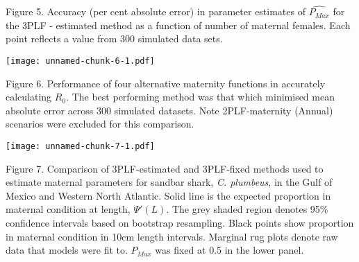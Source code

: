 \documentclass[
]{article}
\begin{document}
Figure 5. Accuracy (per cent absolute error) in parameter estimates of
\(\hat{P_{Max}}\) for the 3PLF - estimated method as a function of
number of maternal females. Each point reflects a value from 300
simulated data sets.\\
\newpage

\texttt{[image: unnamed-chunk-6-1.pdf]}

Figure 6. Performance of four alternative maternity functions in
accurately calculating \(R_0\). The best performing method was that
which minimised mean absolute error across 300 simulated datasets. Note
2PLF-maternity (Annual) scenarios were excluded for this comparison.\\
\newpage

\texttt{[image: unnamed-chunk-7-1.pdf]}

Figure 7. Comparison of 3PLF-estimated and 3PLF-fixed methods used to
estimate maternal parameters for sandbar shark, \emph{C. plumbeus}, in
the Gulf of Mexico and Western North Atlantic. Solid line is the
expected proportion in maternal condition at length, \(\Psi'(L)\). The
grey shaded region denotes 95\% confidence intervals based on bootstrap
resampling. Black points show proportion in maternal condition in 10cm
length intervals. Marginal rug plots denote raw data that models were
fit to. \(P_{Max}\) was fixed at 0.5 in the lower panel.
\end{document}
